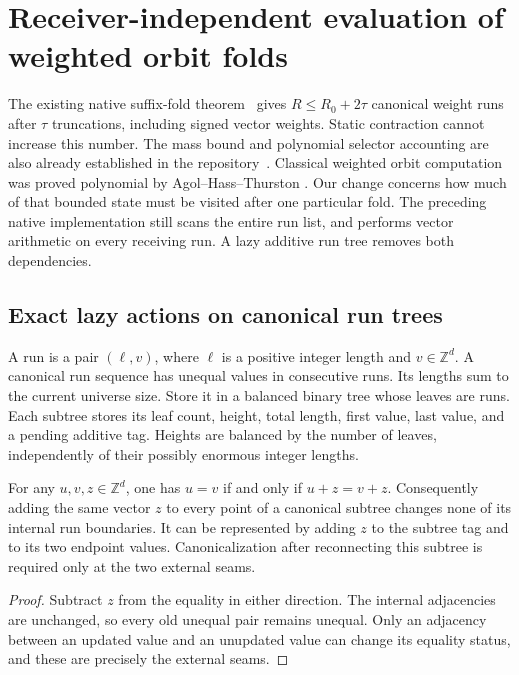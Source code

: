 \section{Receiver-independent evaluation of weighted orbit folds}
\label{sec:lazy-weight-theory}

The existing native suffix-fold theorem~\cite{suffix} gives
$R\le R_0+2\tau$ canonical weight runs after $\tau$ truncations,
including signed vector weights. Static contraction cannot increase this
number. The mass bound and polynomial selector accounting are also already
established in the repository~\cite{weighted}. Classical weighted orbit computation was
proved polynomial by Agol--Hass--Thurston
\cite[Lemma~15 and Theorem~16]{aht}.
Our change concerns how much of that bounded state must be visited after
one particular fold. The preceding native implementation still scans the
entire run list, and performs vector arithmetic on every receiving run.
A lazy additive run tree removes both dependencies.

\subsection{Exact lazy actions on canonical run trees}

A run is a pair $(\ell,v)$, where $\ell$ is a positive integer length and
$v\in\mathbb Z^d$. A canonical run sequence has unequal values in consecutive
runs. Its lengths sum to the current universe size. Store it in a balanced
binary tree whose leaves are runs. Each subtree stores its leaf count,
height, total length, first value, last value, and a pending additive tag.
Heights are balanced by the number of leaves, independently of their
possibly enormous integer lengths.

\begin{lemma}
\label{lem:lazy-translation}
For any $u,v,z\in\mathbb Z^d$, one has $u=v$ if and only if
$u+z=v+z$. Consequently adding the same vector $z$ to every point of a
canonical subtree changes none of its internal run boundaries. It can be
represented by adding $z$ to the subtree tag and to its two endpoint
values. Canonicalization after reconnecting this subtree is required only
at the two external seams.
\end{lemma}
\begin{proof}
Subtract $z$ from the equality in either direction. The internal adjacencies
are unchanged, so every old unequal pair remains unequal. Only an adjacency
between an updated value and an unupdated value can change its equality
status, and these are precisely the external seams.
\end{proof}

